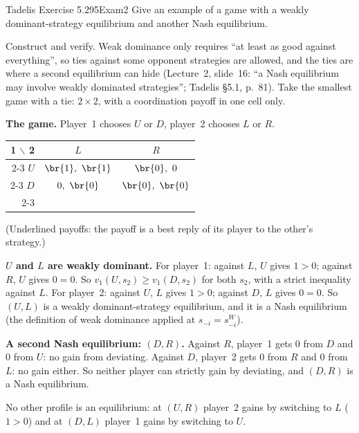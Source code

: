 \begin{exsol}{Tadelis Exercise 5.2}{95}{Exam}{2}
\asked Give an example of a game with a weakly dominant-strategy equilibrium and another Nash
equilibrium.

\method Construct and verify. Weak dominance only requires ``at least as good against everything'',
so ties against some opponent strategies are allowed, and the ties are where a second equilibrium
can hide (Lecture~2, slide~16: ``a Nash equilibrium may involve weakly dominated strategies'';
Tadelis \S5.1, p.~81). Take the smallest game with a tie: $2\times2$, with a coordination payoff in
one cell only.

\solution
\textbf{The game.} Player~1 chooses $U$ or $D$, player~2 chooses $L$ or $R$.
\begin{center}
\begin{tabular}{r|c|c|}
\multicolumn{1}{r}{1 $\backslash$ 2} & \multicolumn{1}{c}{$L$} & \multicolumn{1}{c}{$R$}\\ \cline{2-3}
$U$ & $\br{1},\ \br{1}$ & $\br{0},\ 0$ \\ \cline{2-3}
$D$ & $0,\ \br{0}$ & $\br{0},\ \br{0}$ \\ \cline{2-3}
\end{tabular}
\end{center}
(Underlined payoffs: the payoff is a best reply of its player to the other's strategy.)

\textbf{$U$ and $L$ are weakly dominant.} For player~1: against $L$, $U$ gives $1 > 0$; against $R$,
$U$ gives $0 = 0$. So $v_1(U, s_2) \ge v_1(D, s_2)$ for both $s_2$, with a strict inequality against $L$.
For player~2: against $U$, $L$ gives $1 > 0$; against $D$, $L$ gives $0 = 0$. So $(U, L)$ is a weakly
dominant-strategy equilibrium, and it is a Nash equilibrium (the definition of weak dominance applied
at $s_{-i} = s^W_{-i}$).

\textbf{A second Nash equilibrium: $(D, R)$.} Against $R$, player~1 gets $0$ from $D$ and $0$ from $U$:
no gain from deviating. Against $D$, player~2 gets $0$ from $R$ and $0$ from $L$: no gain either. So
neither player can strictly gain by deviating, and $(D, R)$ is a Nash equilibrium.

No other profile is an equilibrium: at $(U, R)$ player~2 gains by switching to $L$ ($1 > 0$) and at
$(D, L)$ player~1 gains by switching to $U$.



\end{exsol}
